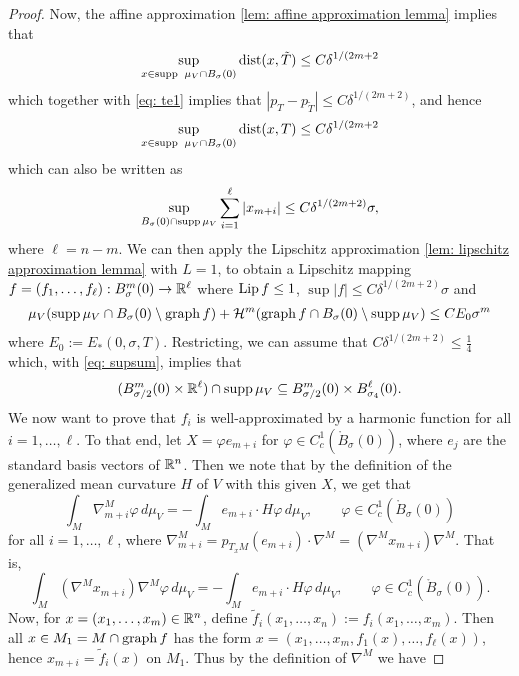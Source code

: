\begin{proof}
Now, the affine approximation \cref{lem: affine approximation lemma} implies that
\[
    \sup_{x\in \operatorname{supp}\ \mu_V \cap B_{\sigma}(0)} \operatorname{dist}(x,\tilde T) \le C\delta^{1/(2m+2}
\]
which together with \eqref{eq: te1} implies that $|p_T-p_{\tilde T}| \le C\delta^{1/(2m+2)}$, and hence
\[
    \sup_{x\in \operatorname{supp}\ \mu_V \cap B_{\sigma}(0)} \operatorname{dist}(x, T) \le C\delta^{1/(2m+2}
\]
which can also be written as
\begin{equation}
    \sup_{B_{\sigma}(0) \cap \operatorname{supp} \mu_V} \sum_{i=1}^{\ell} |x_{m+i}| \le C\delta^{1/(2m+2)}\sigma,\label{eq: supsum}
\end{equation}
where $\ell = n-m$. We can then apply the Lipschitz approximation \cref{lem: lipschitz approximation lemma} with $L=1$, to obtain a Lipschitz mapping $f=(f_1,\dots, f_{\ell}):B^m_{\sigma}(0) \to \mathbb{R}^{\ell}$ where $\operatorname{Lip} f \le 1$, $\sup|f| \le C\delta^{1/(2m+2)}\sigma$ and
\begin{align}
    \mu_V(\operatorname{supp}\mu_V \cap B_{\sigma}(0) \setminus \operatorname{graph} f) + \mathcal{H}^m(\operatorname{graph} f \cap B_{\sigma}(0) \setminus \operatorname{supp}\mu_V) \le CE_0\sigma^m\label{eq: te4}
\end{align}
where $E_0:=E_*(0,\sigma,T)$. Restricting, we can assume that $C\delta^{1/(2m+2)}\le \frac{1}{4}$ which, with \eqref{eq: supsum}, implies that
\begin{align}
    (B_{\sigma/2}^m(0) \times \mathbb{R}^{\ell}) \cap \operatorname{supp} \mu_V \subseteq B_{\sigma/2}^m(0) \times B_{\sigma_4}^{\ell}(0).\label{eq: lsjdf}
\end{align}
We now want to prove that $f_i$ is well-approximated by a harmonic function for all $i=1, \dots, \ell$. To that end, let $X=\varphi e_{m+i}$ for $\varphi \in C_c^1(\mathring{B}_{\sigma}(0))$, where $e_{j}$ are the standard basis vectors of $\mathbb{R}^n$. Then we note that by the definition of the generalized mean curvature $H$ of $V$ with this given $X$, we get that
\begin{equation}
    \int_M \nabla_{m+i}^M \varphi \, d\mu_V = -\int_M e_{m+i}\cdot H\varphi\, d\mu_V, \qquad \varphi \in C_c^1(\mathring{B}_{\sigma}(0))\label{eq: te6}
\end{equation}
for all $i = 1, \dots, \ell$, where $\nabla_{m+i}^M = p_{T_xM}(e_{m+i})\cdot \nabla^M = (\nabla^M x_{m+i})\nabla^M$.
That is,
\[
    \int_M (\nabla^M x_{m+i})\nabla^M \varphi \, d\mu_V = -\int_M e_{m+i}\cdot H\varphi\, d\mu_V, \qquad \varphi \in C_c^1(\mathring{B}_{\sigma}(0)).
\]
Now, for $x = (x_1, \dots, x_m)\in \mathbb{R}^n$, define $\tilde f_i(x_1, \dots, x_n):=f_i(x_1, \dots, x_m)$. Then all $x \in M_1=M \cap \operatorname{graph} f$ has the form $x=(x_1, \dots, x_m, f_1(x), \dots, f_{\ell}(x))$, hence $x_{m+i} = \tilde f_i(x)$ on $M_1$. Thus by the definition of $\nabla^M$ we have

\end{proof}
